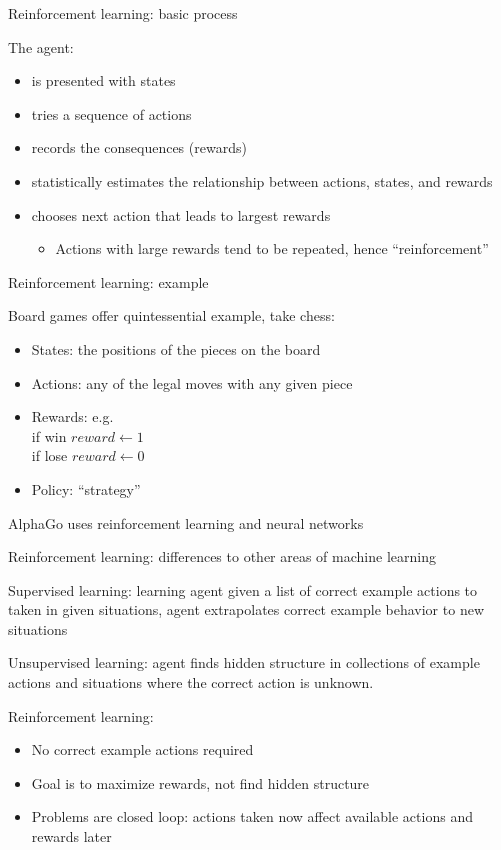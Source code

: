 \documentclass[handout]{beamer}
\begin{document}
\begin{frame}[c]{Reinforcement learning: basic process}

The agent:
\begin{itemize}[<+->]
  \item is presented with states
  \item tries a sequence of actions
  \item records the consequences (rewards)
  \item statistically estimates the relationship between actions, states, and rewards
  \item chooses next action that leads to largest rewards
  \begin{itemize}
    \item Actions with large rewards tend to be repeated, hence ``reinforcement''
  \end{itemize}
\end{itemize}
\end{frame}

\begin{frame}[c]{Reinforcement learning: example}

Board games offer quintessential example, take chess:
\begin{itemize}
    \item States: the positions of the pieces on the board
    \item Actions: any of the legal moves with any given piece
    \item Rewards: e.g. \\
    if win $reward \gets 1$ \\
    if lose $reward \gets 0$
    \item Policy: ``strategy''
\end{itemize}

AlphaGo uses reinforcement learning and neural networks

\end{frame}

\begin{frame}[t]{Reinforcement learning: differences to other areas of machine learning}
  
Supervised learning: learning agent given a list of correct example actions to taken in given situations, agent extrapolates correct example behavior to new situations

Unsupervised learning: agent finds hidden structure in collections of example actions and situations where the correct action is unknown.

Reinforcement learning: 
\begin{itemize}
  \item No correct example actions required
  \item Goal is to maximize rewards, not find hidden structure
  \item Problems are closed loop: actions taken now affect available actions and rewards later
\end{itemize}
  
\end{frame}
\end{document}
